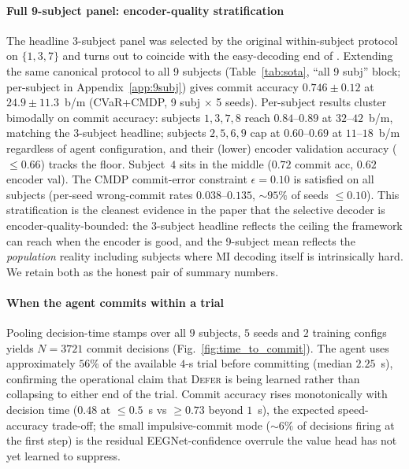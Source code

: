 \paragraph*{Full 9-subject panel: encoder-quality stratification}
The headline 3-subject panel was selected by the original
within-subject protocol on $\{1, 3, 7\}$ and turns out to coincide
with the easy-decoding end of \bcia{}. Extending the same canonical
protocol to all 9 subjects (Table~\ref{tab:sota}, ``all 9 subj''
block; per-subject in Appendix~\ref{app:9subj}) gives commit
accuracy $0.746\!\pm\!0.12$ at $24.9\!\pm\!11.3$~b/m
(CVaR+CMDP, 9 subj $\times$ 5 seeds). Per-subject results
cluster bimodally on commit accuracy: subjects $1, 3, 7, 8$ reach
$0.84$--$0.89$ at $32$--$42$~b/m, matching the 3-subject headline;
subjects $2, 5, 6, 9$ cap at $0.60$--$0.69$ at $11$--$18$~b/m
regardless of agent configuration, and their (lower) encoder
validation accuracy ($\le\!0.66$) tracks the floor. Subject~$4$
sits in the middle ($0.72$ commit acc, $0.62$ encoder val). The CMDP commit-error constraint
$\epsilon\!=\!0.10$ is satisfied on all subjects (per-seed
wrong-commit rates $0.038$--$0.135$, $\sim\!95\%$ of seeds $\le 0.10$).
This stratification is the cleanest evidence in the paper that the
selective decoder is encoder-quality-bounded: the 3-subject
headline reflects the ceiling the framework can reach when the
encoder is good, and the 9-subject mean reflects the
\emph{population} reality including subjects where MI decoding
itself is intrinsically hard. We retain both as the honest pair
of summary numbers.

\paragraph*{When the agent commits within a trial}
Pooling decision-time stamps over all $9$ subjects, $5$ seeds and
$2$ training configs yields $N\!=\!3721$ commit decisions
(Fig.~\ref{fig:time_to_commit}). The agent uses approximately
$56\%$ of the available $4$-s trial before committing (median
$2.25$~s), confirming the operational claim that \textsc{Defer}
is being learned rather than collapsing to either end of the
trial. Commit accuracy rises monotonically with decision time
($0.48$ at $\le\!0.5$~s vs $\ge\!0.73$ beyond $1$~s), the expected
speed-accuracy trade-off; the small impulsive-commit mode
($\sim\!6\%$ of decisions firing at the first step) is the residual
EEGNet-confidence overrule the value head has not yet learned to
suppress.

